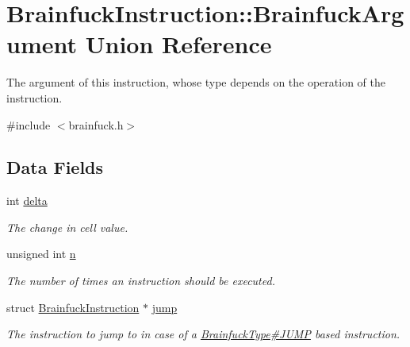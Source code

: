 \hypertarget{unionBrainfuckInstruction_1_1BrainfuckArgument}{}\section{Brainfuck\+Instruction\+:\+:Brainfuck\+Argument Union Reference}
\label{unionBrainfuckInstruction_1_1BrainfuckArgument}


The argument of this instruction, whose type depends on the operation of the instruction.  




{\ttfamily \#include $<$brainfuck.\+h$>$}

\subsection*{Data Fields}
\begin{DoxyCompactItemize}
\item 
\hypertarget{unionBrainfuckInstruction_1_1BrainfuckArgument_a6cba8c4a3622066eb81e77596c1d0f81}{}int \hyperlink{unionBrainfuckInstruction_1_1BrainfuckArgument_a6cba8c4a3622066eb81e77596c1d0f81}{delta}\label{unionBrainfuckInstruction_1_1BrainfuckArgument_a6cba8c4a3622066eb81e77596c1d0f81}

\begin{DoxyCompactList}\small\item\em The change in cell value. \end{DoxyCompactList}\item 
\hypertarget{unionBrainfuckInstruction_1_1BrainfuckArgument_a97c071d0fe8fa7003a14e3d80882228a}{}unsigned int \hyperlink{unionBrainfuckInstruction_1_1BrainfuckArgument_a97c071d0fe8fa7003a14e3d80882228a}{n}\label{unionBrainfuckInstruction_1_1BrainfuckArgument_a97c071d0fe8fa7003a14e3d80882228a}

\begin{DoxyCompactList}\small\item\em The number of times an instruction should be executed. \end{DoxyCompactList}\item 
\hypertarget{unionBrainfuckInstruction_1_1BrainfuckArgument_abc2db2fd901316e0a21224e7ad302ef3}{}struct \hyperlink{structBrainfuckInstruction}{Brainfuck\+Instruction} $\ast$ \hyperlink{unionBrainfuckInstruction_1_1BrainfuckArgument_abc2db2fd901316e0a21224e7ad302ef3}{jump}\label{unionBrainfuckInstruction_1_1BrainfuckArgument_abc2db2fd901316e0a21224e7ad302ef3}

\begin{DoxyCompactList}\small\item\em The instruction to jump to in case of a \hyperlink{}{Brainfuck\+Type\#\+J\+U\+M\+P} based instruction. \end{DoxyCompactList}\end{DoxyCompactItemize}


